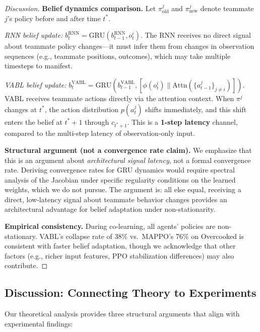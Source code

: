\documentclass{article}
\theoremstyle{plain}
\theoremstyle{definition}
\theoremstyle{remark}
\begin{document}
\begin{proof}[Discussion]
\textbf{Belief dynamics comparison.}
Let $\pi_{\mathrm{old}}^j$ and $\pi_{\mathrm{new}}^j$ denote teammate $j$'s policy before and after time $t^*$.

\emph{RNN belief update:}
$b_t^{\mathrm{RNN}} = \text{GRU}(b_{t-1}^{\mathrm{RNN}}, o_t^i)$.
The RNN receives no direct signal about teammate policy changes---it must infer them from changes in observation sequences (e.g., teammate positions, outcomes), which may take multiple timesteps to manifest.

\emph{VABL belief update:}
$b_t^{\mathrm{VABL}} = \text{GRU}(b_{t-1}^{\mathrm{VABL}}, [\phi(o_t^i) \| \mathrm{Attn}(\{a_{t-1}^j\}_{j \neq i})])$.
VABL receives teammate actions directly via the attention context. When $\pi^j$ changes at $t^*$, the action distribution $p(a_t^j)$ shifts immediately, and this shift enters the belief at $t^*{+}1$ through $c_{t^*+1}$. This is a \textbf{1-step latency} channel, compared to the multi-step latency of observation-only input.

\textbf{Structural argument (not a convergence rate claim).}
We emphasize that this is an argument about \emph{architectural signal latency}, not a formal convergence rate. Deriving convergence rates for GRU dynamics would require spectral analysis of the Jacobian under specific regularity conditions on the learned weights, which we do not pursue. The argument is: all else equal, receiving a direct, low-latency signal about teammate behavior changes provides an architectural advantage for belief adaptation under non-stationarity.

\textbf{Empirical consistency.}
During co-learning, all agents' policies are non-stationary. VABL's collapse rate of 38\% vs.\ MAPPO's 76\% on Overcooked is consistent with faster belief adaptation, though we acknowledge that other factors (e.g., richer input features, PPO stabilization differences) may also contribute.
\end{proof}

\subsection{Discussion: Connecting Theory to Experiments}

Our theoretical analysis provides three structural arguments that align with experimental findings:
\end{document}
